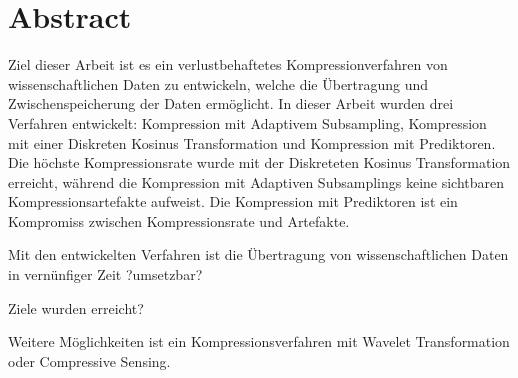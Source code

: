 \section*{Abstract}
Ziel dieser Arbeit ist es ein verlustbehaftetes Kompressionverfahren von wissenschaftlichen Daten zu entwickeln, welche die Übertragung und Zwischenspeicherung der Daten ermöglicht.
In dieser Arbeit wurden drei Verfahren entwickelt: Kompression mit Adaptivem Subsampling, Kompression mit einer Diskreten Kosinus Transformation und Kompression mit Prediktoren. Die höchste Kompressionsrate wurde mit der Diskreteten Kosinus Transformation erreicht, während die Kompression mit Adaptiven Subsamplings keine sichtbaren Kompressionsartefakte aufweist. Die Kompression mit Prediktoren ist ein Kompromiss zwischen Kompressionsrate und Artefakte.

Mit den entwickelten Verfahren ist die Übertragung von wissenschaftlichen Daten in vernünfiger Zeit ?umsetzbar?

Ziele wurden erreicht?

Weitere Möglichkeiten ist ein Kompressionsverfahren mit Wavelet Transformation oder Compressive Sensing.